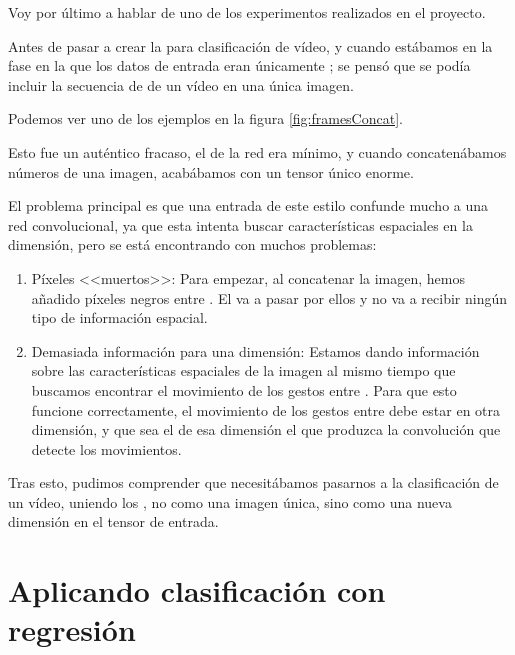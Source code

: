 Voy por último a hablar de uno de los experimentos realizados en el proyecto.

Antes de pasar a crear la  para clasificación de vídeo, y cuando estábamos en la fase en la que los datos de entrada eran únicamente ; se pensó que se podía incluir la secuencia de  de un vídeo en una única imagen.

Podemos ver uno de los ejemplos en la figura \ref{fig:framesConcat}.


Esto fue un auténtico fracaso, el  de la red era mínimo, y cuando concatenábamos números  de una imagen, acabábamos con un tensor único enorme.

El problema principal es que una entrada de este estilo confunde mucho a una red convolucional, ya que esta intenta buscar características espaciales en la dimensión, pero se está encontrando con muchos problemas:

\begin{enumerate}
  \item Píxeles <<muertos>>: Para empezar, al concatenar la imagen, hemos añadido píxeles negros entre . El  va a pasar por ellos y no va a recibir ningún tipo de información espacial.
  \item Demasiada información para una dimensión: Estamos dando información sobre las características espaciales de la imagen al mismo tiempo que buscamos encontrar el movimiento de los gestos entre 
        . Para que esto funcione correctamente, el movimiento de los gestos entre 
        debe estar en otra dimensión, y que sea el  de esa dimensión el que produzca la convolución que detecte los movimientos.
\end{enumerate}

Tras esto, pudimos comprender que necesitábamos pasarnos a la clasificación de un vídeo, uniendo los , no como una imagen única, sino como una nueva dimensión en el tensor de entrada.


\section{Aplicando clasificación con regresión}

